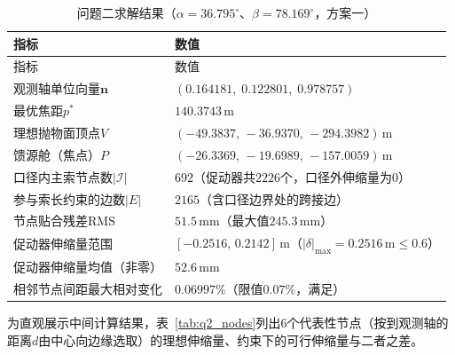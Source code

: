 \documentclass[withoutpreface]{cumcmthesis}
\begin{document}
\begin{longtable}{p{5.4cm}p{7.6cm}}
\caption{问题二求解结果（$\alpha=36.795^{\circ}$、$\beta=78.169^{\circ}$，方案一）} \label{tab:q2_result} \\
\toprule
指标 & 数值 \\
\midrule
\endfirsthead
\toprule
指标 & 数值 \\
\midrule
\endhead
\bottomrule
\endfoot
\bottomrule
\endlastfoot
观测轴单位向量$\mathbf{n}$ & $(0.164181,\;0.122801,\;0.978757)$ \\
最优焦距$p^{*}$ & $140.3743\,\mathrm{m}$ \\
理想抛物面顶点$V$ & $(-49.3837,\,-36.9370,\,-294.3982)\,\mathrm{m}$ \\
馈源舱（焦点）$P$ & $(-26.3369,\,-19.6989,\,-157.0059)\,\mathrm{m}$ \\
口径内主索节点数$|\mathcal{I}|$ & $692$（促动器共$2226$个，口径外伸缩量为$0$） \\
参与索长约束的边数$|E|$ & $2165$（含口径边界处的跨接边） \\
节点贴合残差$\mathrm{RMS}$ & $51.5\,\mathrm{mm}$（最大值$245.3\,\mathrm{mm}$） \\
促动器伸缩量范围 & $[-0.2516,\,0.2142]\,\mathrm{m}$（$|\delta|_{\max}=0.2516\,\mathrm{m}\le0.6$） \\
促动器伸缩量均值（非零） & $52.6\,\mathrm{mm}$ \\
相邻节点间距最大相对变化 & $0.06997\%$（限值$0.07\%$，满足） \\
\bottomrule
\end{longtable}

为直观展示中间计算结果，表~\ref{tab:q2_nodes}列出$6$个代表性节点（按到观测轴的距离$d$由中心向边缘选取）的理想伸缩量、约束下的可行伸缩量与二者之差。
\end{document}
